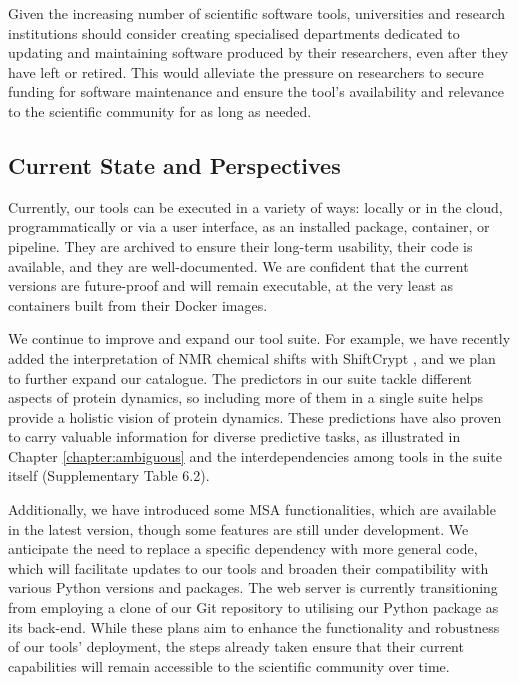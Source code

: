 Given the increasing number of scientific software tools, universities and research institutions should consider creating specialised departments dedicated to updating and maintaining software produced by their researchers, even after they have left or retired. This would alleviate the pressure on researchers to secure funding for software maintenance and ensure the tool's availability and relevance to the scientific community for as long as needed.


\subsection{Current State and Perspectives}

Currently, our tools can be executed in a variety of ways: locally or in the cloud, programmatically or via a user interface, as an installed package, container, or pipeline. They are archived to ensure their long-term usability, their code is available, and they are well-documented. We are confident that the current versions are future-proof and will remain executable, at the very least as containers built from their Docker images.

We continue to improve and expand our tool suite. For example, we have recently added the interpretation of NMR chemical shifts with ShiftCrypt \cite{orlando_shiftcrypt_2020}, and we plan to further expand our catalogue. The predictors in our suite tackle different aspects of protein \gls{dynamics}, so including more of them in a single suite helps provide a holistic vision of protein \gls{dynamics}. These predictions have also proven to carry valuable information for diverse predictive tasks, as illustrated in Chapter \ref{chapter:ambiguous} \cite{roca-martinez_challenges_2022} and the interdependencies among tools in the suite itself (Supplementary Table 6.2). 

Additionally, we have introduced some MSA functionalities, which are available in the latest version, though some features are still under development. We anticipate the need to replace a specific dependency with more general code, which will facilitate updates to our tools and broaden their compatibility with various Python versions and packages. The web server is currently transitioning from employing a clone of our Git repository to utilising our Python package as its back-end. While these plans aim to enhance the functionality and robustness of our tools' deployment, the steps already taken ensure that their current capabilities will remain accessible to the scientific community over time.

